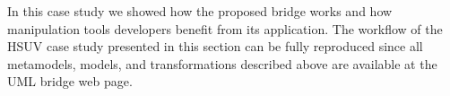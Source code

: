 In this case study we showed how the proposed bridge works and how manipulation tools developers benefit
from its application. 
The workflow of the HSUV case study presented in this section can be fully reproduced
since all metamodels, models, and transformations described above are available at the UML bridge web page.


